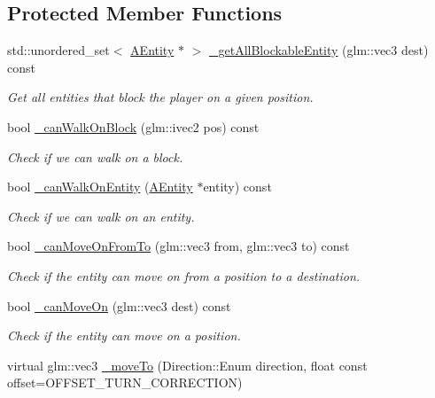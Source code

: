 \subsection*{Protected Member Functions}
\begin{DoxyCompactItemize}
\item 
std\+::unordered\+\_\+set$<$ \hyperlink{class_a_entity}{A\+Entity} $\ast$ $>$ \hyperlink{class_a_character_aef50edb318dc54c0fcccf053df180099}{\+\_\+get\+All\+Blockable\+Entity} (glm\+::vec3 dest) const
\begin{DoxyCompactList}\small\item\em Get all entities that block the player on a given position. \end{DoxyCompactList}\item 
bool \hyperlink{class_a_character_a82a72081a1261d749da88f4464757008}{\+\_\+can\+Walk\+On\+Block} (glm\+::ivec2 pos) const
\begin{DoxyCompactList}\small\item\em Check if we can walk on a block. \end{DoxyCompactList}\item 
bool \hyperlink{class_a_character_afce84f8aaaedb3f889f0d52e5f592ea8}{\+\_\+can\+Walk\+On\+Entity} (\hyperlink{class_a_entity}{A\+Entity} $\ast$entity) const
\begin{DoxyCompactList}\small\item\em Check if we can walk on an entity. \end{DoxyCompactList}\item 
bool \hyperlink{class_a_character_a771fdf0a7773de142d51ed599f3d557d}{\+\_\+can\+Move\+On\+From\+To} (glm\+::vec3 from, glm\+::vec3 to) const
\begin{DoxyCompactList}\small\item\em Check if the entity can move on from a position to a destination. \end{DoxyCompactList}\item 
bool \hyperlink{class_a_character_afbdeafa3e136320d980db3cf7f1fe7c7}{\+\_\+can\+Move\+On} (glm\+::vec3 dest) const
\begin{DoxyCompactList}\small\item\em Check if the entity can move on a position. \end{DoxyCompactList}\item 
virtual glm\+::vec3 \hyperlink{class_a_character_a4785e1688ede03fe488bfdfd3d2339ee}{\+\_\+move\+To} (Direction\+::\+Enum direction, float const offset=O\+F\+F\+S\+E\+T\+\_\+\+T\+U\+R\+N\+\_\+\+C\+O\+R\+R\+E\+C\+T\+I\+ON)

\end{DoxyCompactItemize}
